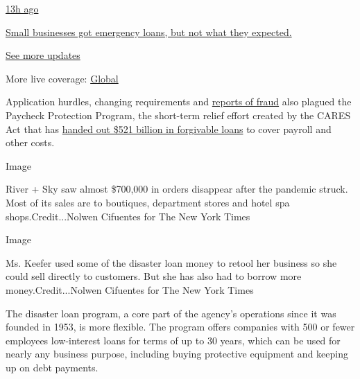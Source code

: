 \href{https://www.nytimes3xbfgragh.onion/live/2020/08/03/business/stock-market-today-coronavirus?action=click\&pgtype=Article\&state=default\&region=MAIN_CONTENT_1\&context=storylines_live_updates\#small-businesses-got-emergency-loans-but-not-what-they-expected}{13h
ago}

\href{https://www.nytimes3xbfgragh.onion/live/2020/08/03/business/stock-market-today-coronavirus?action=click\&pgtype=Article\&state=default\&region=MAIN_CONTENT_1\&context=storylines_live_updates\#small-businesses-got-emergency-loans-but-not-what-they-expected}{Small
businesses got emergency loans, but not what they expected.}

\href{https://www.nytimes3xbfgragh.onion/live/2020/08/03/business/stock-market-today-coronavirus?action=click\&pgtype=Article\&state=default\&region=MAIN_CONTENT_1\&context=storylines_live_updates}{See
more updates}

More live coverage:
\href{https://www.nytimes3xbfgragh.onion/2020/08/03/world/coronavirus-covid-19.html?action=click\&pgtype=Article\&state=default\&region=MAIN_CONTENT_1\&context=storylines_live_updates}{Global}

Application hurdles, changing requirements and
\href{https://www.nytimes3xbfgragh.onion/2020/07/27/us/lamborghini-ppp-covid-19.html}{reports
of fraud} also plagued the Paycheck Protection Program, the short-term
relief effort created by the CARES Act that has
\href{https://www.nytimes3xbfgragh.onion/2020/06/30/business/paycheck-protection-program-coronavirus.html}{handed
out \$521 billion in forgivable loans} to cover payroll and other costs.

Image

River + Sky saw almost \$700,000 in orders disappear after the pandemic
struck. Most of its sales are to boutiques, department stores and hotel
spa shops.Credit...Nolwen Cifuentes for The New York Times

Image

Ms. Keefer used some of the disaster loan money to retool her business
so she could sell directly to customers. But she has also had to borrow
more money.Credit...Nolwen Cifuentes for The New York Times

The disaster loan program, a core part of the agency's operations since
it was founded in 1953, is more flexible. The program offers companies
with 500 or fewer employees low-interest loans for terms of up to 30
years, which can be used for nearly any business purpose, including
buying protective equipment and keeping up on debt payments.

